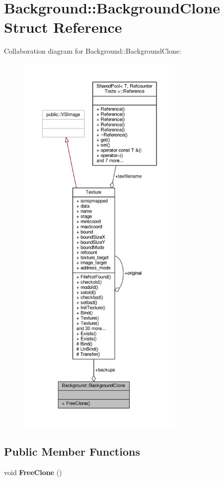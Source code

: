 \hypertarget{structBackground_1_1BackgroundClone}{}\section{Background\+:\+:Background\+Clone Struct Reference}
\label{structBackground_1_1BackgroundClone}


Collaboration diagram for Background\+:\+:Background\+Clone\+:
\nopagebreak
\begin{figure}[H]
\begin{center}
\leavevmode
\includegraphics[height=550pt]{dd/d83/structBackground_1_1BackgroundClone__coll__graph}
\end{center}
\end{figure}
\subsection*{Public Member Functions}
\begin{DoxyCompactItemize}
\item 
void {\bfseries Free\+Clone} ()\hypertarget{structBackground_1_1BackgroundClone_ae6dc337fab662ddd31a43a3af75acc91}{}\label{structBackground_1_1BackgroundClone_ae6dc337fab662ddd31a43a3af75acc91}

\end{DoxyCompactItemize}
